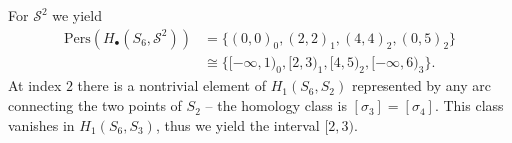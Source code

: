 \begin{example}{\cite[\S 2.4, Example]{de2011dualities}}
	For $\mathcal{S}^{2}$ we yield
	\begin{align}
		\mathrm{Pers}(H_{\bullet}(S_{6},\mathcal{S}^{2})) & = \{(0,0)_{0}, (2,2)_{1}, (4,4)_{2}, (0,5)_{2}\}               \\
		                                                  & \cong \{[-\infty, 1)_{0}, [2,3)_{1}, [4,5)_{2}, [-\infty,6)_{3}\}.
	\end{align}
	At index $2$ there is a nontrivial element of $H_{1}(S_{6},S_{2})$ represented
	by any arc connecting the two points of $S_{2}$ --
	the homology class is $[\sigma_{3}] = [\sigma_{4}]$. This class vanishes in $H_{1}(S_{6},S_{3})$, thus we yield the interval $[2,3)$.
\end{example}

